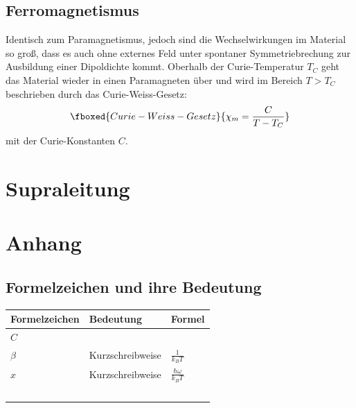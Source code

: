 \documentclass[bfvec]{summery_5.0}
\begin{document}
\subsection{Ferromagnetismus}
Identisch zum Paramagnetismus, jedoch sind die Wechselwirkungen im Material so groß, dass es auch ohne externes Feld unter spontaner Symmetriebrechung zur Ausbildung einer Dipoldichte kommt. Oberhalb der Curie-Temperatur $T_C$ geht das Material wieder in einen Paramagneten über und wird im Bereich $T>T_C$ beschrieben durch das Curie-Weiss-Gesetz:
\begin{align*}
    \fboxed{Curie-Weiss-Gesetz}{\chi_m = \frac{C}{T-T_C}}
\end{align*}
mit der Curie-Konstanten $C$.


\section{Supraleitung}

\section{Anhang}
\subsection{Formelzeichen und ihre Bedeutung}
\begin{center}
\begin{tabular}{@{}lll@{}}
    \toprule
    {\bf Formelzeichen} & {\bf Bedeutung} & {\bf Formel} \\
    \midrule
    \(C\) & \(\) & \(\) \\
    \(\beta \) & Kurzschreibweise & \(\frac{1}{k_B T}\) \\
    \(x\) & Kurzschreibweise & \(\frac{\hbar\omega}{k_B T}\) \\
    \(\) & \(\) & \(\) \\
    \bottomrule
\end{tabular}
\end{center}
\end{document}
